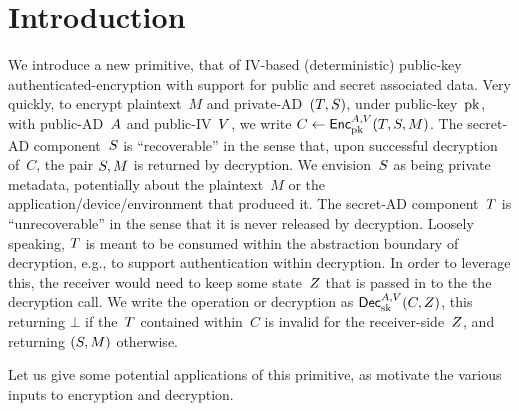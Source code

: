 \section{Introduction}
\label{sec:intro}
We introduce a new primitive, that of IV-based (deterministic) public-key authenticated-encryption with support for public and secret associated data.  Very quickly, to encrypt plaintext~$M$ and private-AD~$(T,S)$, under public-key~$\mathrm{pk}$, with public-AD~$A$ and public-IV~$V$, we write $C\gets{\mathsf{Enc}}_{\mathrm{pk}}^{A,V}(T,S,M)$.  The secret-AD component~$S$ is ``recoverable'' in the sense that, upon successful decryption of~$C$, the pair $S,M$ is returned by decryption.  We envision~$S$ as being private metadata, potentially about the plaintext~$M$ or the application/device/environment that produced it.  The secret-AD component~$T$ is ``unrecoverable'' in the sense that it is never released by decryption.  Loosely speaking, $T$ is meant to be consumed within the abstraction boundary of decryption, e.g., to support authentication within decryption.  In order to leverage this, the receiver would need to keep some state~$Z$ that is passed in to the the decryption call.  We write the operation or decryption as ${\mathsf{Dec}}_{\mathrm{sk}}^{A,V}(C,Z)$, this returning $\bot$ if the~$T$ contained within~$C$ is invalid for the receiver-side~$Z$, and returning $(S,M)$ otherwise.

Let us give some potential applications of this primitive, as motivate the various inputs to encryption and decryption.

